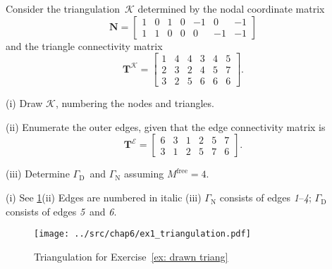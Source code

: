 \begin{Exercises}
\exercise\label{ex: drawn triang}
Consider the triangulation~$\mathcal{K}$ determined by the nodal coordinate 
matrix
\[
\boldsymbol{N}=\begin{bmatrix}
1&0&1&0&-1& 0&-1\\
1&1&0&0& 0&-1&-1\end{bmatrix}
\]
and the triangle connectivity matrix
\[
\boldsymbol{T}^{\mathcal{K}}=\begin{bmatrix}
1&4&4&3&4&5\\
2&3&2&4&5&7\\
3&2&5&6&6&6\end{bmatrix}.
\]
\begin{description}
\item{(i)} Draw $\mathcal{K}$, numbering the nodes and triangles.
\item{(ii)} Enumerate the outer edges, given that the edge connectivity
matrix is
\[
\boldsymbol{T}^{\mathcal{E}}=\begin{bmatrix}
6&3&1&2&5&7\\
3&1&2&5&7&6\end{bmatrix}.
\]
\item{(iii)} Determine $\Gamma_{\mathrm{D}}$~and $\Gamma_{\mathrm{N}}$ assuming 
$M^{\textrm{free}}=4$.
\end{description}
\begin{ans}
(i) See \cref{fig: drawn triang}\quad (ii) Edges are numbered in italic\quad
(iii) $\Gamma_{\mathrm{N}}$ consists of edges 
\emph{1}--\emph{4}; $\Gamma_{\mathrm{D}}$ consists of edges \emph{5}~and 
\emph{6}.
\begin{figure}
\caption{Triangulation for Exercise~\ref{ex: drawn triang}}
\label{fig: drawn triang}
\begin{center}
\texttt{[image: ../src/chap6/ex1\_triangulation.pdf]}
\end{center}
\end{figure}
\end{ans}


\end{Exercises}
